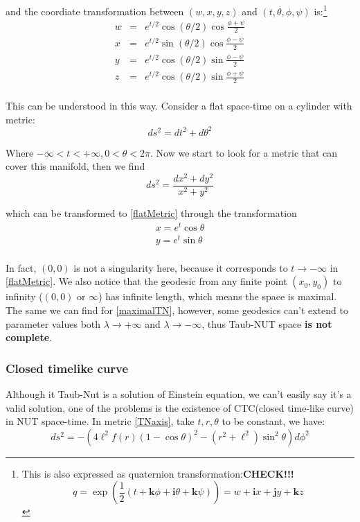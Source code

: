 \documentclass[12pt, a4paper]{article}
\numberwithin{equation}{section}
\newcommand{\be}{\begin{equation}}
\newcommand{\ee}{\end{equation}}
\begin{document}
and the coordiate transformation between $(w, x, y, z)$ and $(t, \theta, \phi, \psi)$ is:\footnote{This is also expressed as quaternion transformation:\textbf{CHECK!!!}
	\be
	q = \exp\left(\frac{1}{2}(t+\textbf{k}\phi + \textbf{i}\theta + \textbf{k}\psi)\right) = w + \textbf{i}x + \textbf{j}y + \textbf{k}z
	\ee}
\be
\begin{aligned}
	w &=& e^{t/2}\cos(\theta/2)\cos\frac{\phi+\psi}{2}\\
	x &=& e^{t/2}\sin(\theta/2)\cos\frac{\phi-\psi}{2}\\
	y &=& e^{t/2}\cos(\theta/2)\sin\frac{\phi-\psi}{2}\\
	z &=& e^{t/2}\cos(\theta/2)\sin\frac{\phi+\psi}{2}\\
\end{aligned}
\ee

This can be understood in this way. Consider a flat space-time on a cylinder with metric:
\be
ds^2 = dt^2 + d\theta^2
\label{flatMetric}
\ee

Where $-\infty < t < + \infty, 0 < \theta < 2\pi$. Now we start to look for a metric that can cover this manifold, then we find 
\be
ds^2 = \frac{dx^2 + dy^2}{x^2 + y^2}
\ee

which can be transformed to \ref{flatMetric} through the transformation
\be
\begin{aligned}
	x = e^t \cos\theta\\
	y = e^t \sin\theta\\
\end{aligned}
\ee

In fact, $(0,0)$ is not a singularity here, because it corresponds to $t\rightarrow-\infty$ in \ref{flatMetric}. We also notice that the geodesic from any finite point $(x_0, y_0)$ to infinity ($(0,0)$ or $\infty$) has infinite length, which means the space is maximal. The same we can find for \ref{maximalTN}, however, some geodesics can't extend to parameter values both $\lambda \rightarrow +\infty$ and $\lambda \rightarrow -\infty$, thus Taub-NUT space \textbf{is not complete}.\cite{Misner:1965aa}

\subsubsection{Closed timelike curve}
Although it Taub-Nut is a solution of Einstein equation, we can't easily say it's a valid solution, one of the problems is the existence of CTC(closed time-like curve) in NUT space-time. In metric \ref{TNaxis}, take $t, r, \theta$ to be constant, we have:
\be
ds^2 = -\left(4\ell^2 f(r) (1-\cos\theta)^2 - (r^2 +\ell^2)\sin^2\theta\right)d\phi^2
\ee
\end{document}
